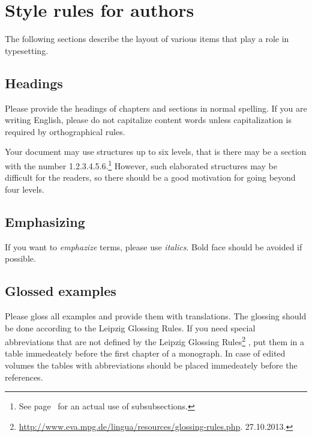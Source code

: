 \chapter{Style rules for authors}







The following sections describe the layout of various items that play a role in typesetting. 

\section{Headings}

Please provide the headings of chapters and sections in normal spelling. If you are writing English,
please do not capitalize content words unless capitalization is required by orthographical rules. 

Your document may use structures up to six levels, that is there may be a section with
the number 1.2.3.4.5.6.\footnote{
  See page~\pageref{sec-Chinese} for an actual use of subsubsections.%
} However, such elaborated structures may be difficult for the readers, so
there should be a good motivation for going beyond four levels.


\section{Emphasizing}

If you want to \emph{emphazize} terms, please use \emph{italics}. Bold face should be avoided if
possible.

\section{Glossed examples}

Please gloss all examples and provide them with translations. The glossing should be done according
to the Leipzig Glossing Rules. If you need special abbreviations that are not defined by the Leipzig
Glossing Rules\footnote{
\url{http://www.eva.mpg.de/lingua/resources/glossing-rules.php}. 27.10.2013.
}
, put them in a table immedeately before the first chapter of a
monograph. In case of edited volumes the tables with abbreviations should be placed immedeately
before the references.

